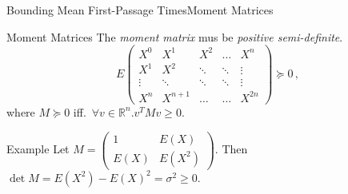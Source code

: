 \documentclass[10pt]{beamer}
\newcommand{\expSym}{{E}}
\newcommand{\E}[1]{\ensuremath{\expSym\left(#1\right)}}
\newcommand{\bottomcite}[1]{\vspace*{\fill} {\scriptsize \parencite{#1}}}
\begin{document}
\begin{frame}{Bounding Mean First-Passage Times}{Moment Matrices}
    \begin{block}{Moment Matrices}
    The \emph{moment matrix} mus be \emph{positive semi-definite}.
    \[
        \E{\begin{matrix}
            X^0 & X^1 & X^2 & \dots & X^n \\
            X^1 & X^2 & \ddots & \ddots & \vdots \\
            \vdots & \ddots & \ddots & \ddots & \vdots \\
            X^n & X^{n+1} & \dots & \dots & X^{2n}
        \end{matrix}}\succeq 0 \,,
    \]
        where $M\succeq 0$ iff.\ $\forall v \in \mathbb{R}^n. v^T M v\geq 0$.
    \end{block}
          \begin{exampleblock}{Example}
              Let
              $M=\left(\begin{matrix} 1 & \E{X} \\
              \E{X} & \E{X^2} \end{matrix}\right)$. Then $\det M = \E{X^2}-\E{X}^2 = \sigma^2 \geq 0$.
          \end{exampleblock}
\bottomcite{backenkohler2019bounding}
\end{frame}
\end{document}

